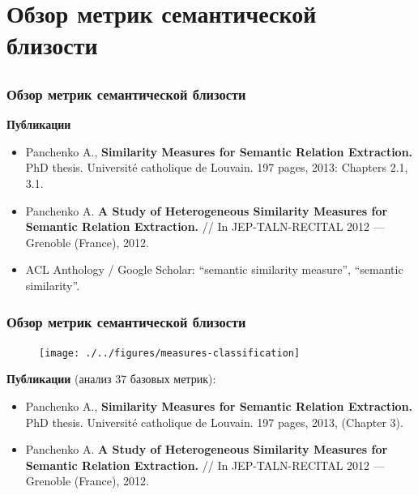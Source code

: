 

\section[Обзор метрик]{Обзор метрик семантической близости} 
\subsection{  }


\begin{frame}
\frametitle{Обзор метрик семантической близости}

\textbf{Публикации} 
\begin{itemize}
\item Panchenko A., \textbf{Similarity Measures for Semantic Relation Extraction.} PhD thesis. Universit\'{e} catholique de Louvain. 197
pages, 2013: \alert{Chapters 2.1, 3.1}. 
\item Panchenko A. \textbf{A Study of Heterogeneous Similarity Measures for Semantic Relation Extraction.} // In JEP-TALN-RECITAL 2012 — Grenoble (France), 2012.

\item ACL Anthology / Google Scholar: \alert{``semantic similarity measure''}, \alert{``semantic similarity''}. 
\end{itemize}
 
\end{frame}



\begin{frame}
\frametitle{Обзор метрик семантической близости}

\begin{figure}
\texttt{[image: ./../figures/measures-classification]}
\end{figure}

\textbf{Публикации} (анализ 37 базовых метрик):
\begin{itemize}
\item Panchenko A., \textbf{Similarity Measures for Semantic Relation Extraction.} PhD thesis. Universit\'{e} catholique de Louvain. 197
pages, 2013, (Chapter 3). 
\item Panchenko A. \textbf{A Study of Heterogeneous Similarity Measures for Semantic Relation Extraction.} // In JEP-TALN-RECITAL 2012 — Grenoble (France), 2012. 
\end{itemize}
 
\end{frame}




